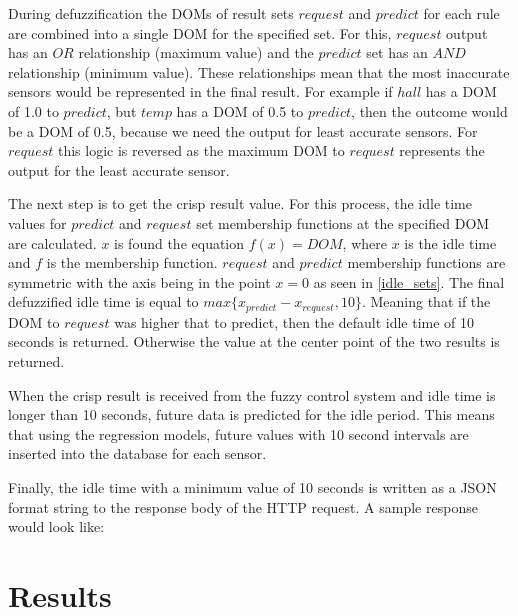 During defuzzification the DOMs of result sets $request$ and $predict$ for each rule are combined into a single DOM for the specified set. For this, $request$ output has an $OR$ relationship (maximum value) and the $predict$ set has an $AND$ relationship (minimum value). These relationships mean that the most inaccurate sensors would be represented in the final result. For example if $hall$ has a DOM of 1.0 to $predict$, but $temp$ has a DOM of 0.5 to $predict$, then the outcome would be a DOM of 0.5, because we need the output for least accurate sensors. For $request$ this logic is reversed as the maximum DOM to $request$ represents the output for the least accurate sensor. 

The next step is to get the crisp result value. For this process, the idle time values for $predict$ and $request$ set membership functions at the specified DOM are calculated. $x$ is found the equation $f(x) = DOM$, where $x$ is the idle time and $f$ is the membership function. $request$ and $predict$ membership functions are symmetric with the axis being in the point $x = 0$ as seen in \autoref{idle_sets}. The final defuzzified idle time is equal to $max\{x_{predict} - x_{request}, 10\}$. Meaning that if the DOM to $request$ was higher that to predict, then the default idle time of 10 seconds is returned. Otherwise the value at the center point of the two results is returned.

When the crisp result is received from the fuzzy control system and idle time is longer than 10 seconds, future data is predicted for the idle period. This means that using the regression models, future values with 10 second intervals are inserted into the database for each sensor. 

Finally, the idle time with a minimum value of 10 seconds is written as a JSON format string to the response body of the HTTP request. A sample response would look like: 

\section{Results}
\\
\\


